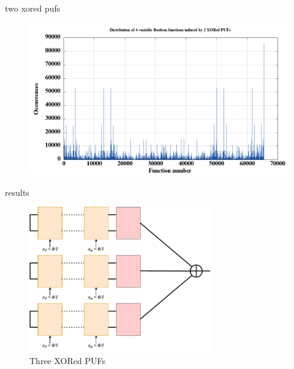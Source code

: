 \documentclass[10pt, compress]{beamer}
\begin{document}
\begin{frame}{two xored pufs}
    \begin{figure}
        \centering
        \includegraphics[width=\textwidth]{figures/dist/distribution_of_4-variable_boolean_functions_induced_by_2_xored_pufs.png}
    \end{figure}
\end{frame}


\begin{frame}{results}
    \begin{figure}
        \centering
        \includegraphics[width=0.7\textwidth]{figures/puf_3_xor.pdf}
        \caption{Three XORed PUFs}
    \end{figure}
\end{frame}
\end{document}
